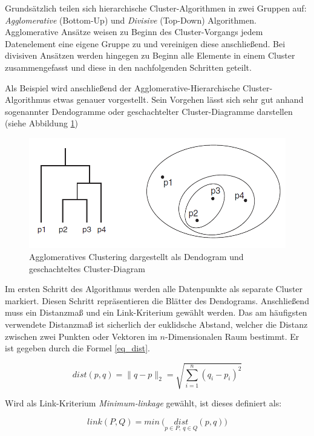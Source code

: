 Grundsätzlich teilen sich hierarchische Cluster-Algorithmen in zwei Gruppen auf:
\textit{Agglomerative} (Bottom-Up) und \textit{Divisive} (Top-Down) Algorithmen.
Agglomerative Ansätze weisen zu Beginn des Cluster-Vorgangs jedem Datenelement eine eigene Gruppe zu und vereinigen
diese anschließend.
Bei divisiven Ansätzen werden hingegen zu Beginn alle Elemente in einem Cluster zusammengefasst und
diese in den nachfolgenden Schritten geteilt.

Als Beispiel wird anschließend der Agglomerative-Hierarchische Cluster-Algorithmus etwas genauer vorgestellt.
Sein Vorgehen lässt sich sehr gut anhand sogenannter Dendogramme oder geschachtelter Cluster-Diagramme darstellen
(siehe Abbildung \ref{fig:grund_agglo_clustering})

\begin{figure}[H]
    \centering
    \includegraphics[width=0.7\linewidth]{../resources/img/grundlagen/agglo_clustering}
    \caption{Agglomeratives Clustering dargestellt als Dendogram und geschachteltes Cluster-Diagram}
    \label{fig:grund_agglo_clustering}
\end{figure}

Im ersten Schritt des Algorithmus werden alle Datenpunkte als separate Cluster markiert. Diesen Schritt
repräsentieren die Blätter des Dendograms.
Anschließend muss ein Distanzmaß und ein Link-Kriterium gewählt werden.
Das am häufigsten verwendete Distanzmaß ist sicherlich der euklidsche Abstand, welcher die Distanz zwischen zwei Punkten
oder Vektoren im $n$-Dimensionalen Raum bestimmt. Er ist gegeben durch die Formel \ref{eq_dist}.

\begin{equation}
\label{eq_dist}
    dist(p,q) = \|q-p\|_2 = \sqrt{\sum_{i=1}^n (q_i-p_i)^2}
\end{equation}

Wird als Link-Kriterium \textit{Minimum-linkage} gewählt, ist dieses definiert als:

\begin{equation}
\label{eq_linkage}
    link(P, Q) = min\ \Big(\underset{p \in P,\ q \in Q}{dist}(p, q)\Big)
\end{equation}

